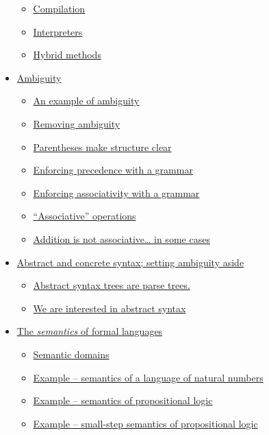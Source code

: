 \documentclass[11pt]{article}
\theoremstyle{definition}
\begin{document}
\begin{scriptsize}
\begin{itemize}
\begin{itemize}
\item \hyperref[sec:orgf94dfeb]{Compilation}
\item \hyperref[sec:orga4e2231]{Interpreters}
\item \hyperref[sec:orgfb8a43b]{Hybrid methods}
\end{itemize}
\item \hyperref[sec:org5846edf]{Ambiguity}
\begin{itemize}
\item \hyperref[sec:orgf5fa90c]{An example of ambiguity}
\item \hyperref[sec:org809ed05]{Removing ambiguity}
\item \hyperref[sec:orgfacd5ca]{Parentheses make structure clear}
\item \hyperref[sec:orgd04cbac]{Enforcing precedence with a grammar}
\item \hyperref[sec:org1bf2b64]{Enforcing associativity with a grammar}
\item \hyperref[sec:org6ad7544]{“Associative” operations}
\item \hyperref[sec:orgf9a2272]{Addition is not associative… in some cases}
\end{itemize}
\item \hyperref[sec:org82e4bfd]{Abstract and concrete syntax; setting ambiguity aside}
\begin{itemize}
\item \hyperref[sec:orgf3f4748]{Abstract syntax trees are parse trees.}
\item \hyperref[sec:orga8a2924]{We are interested in abstract syntax}
\end{itemize}
\item \hyperref[sec:org858dcd4]{The \emph{semantics} of formal languages}
\begin{itemize}
\item \hyperref[sec:org1b5b75d]{Semantic domains}
\item \hyperref[sec:orgf932e15]{Example – semantics of a language of natural numbers}
\item \hyperref[sec:orgd3c8abf]{Example – semantics of propositional logic}
\item \hyperref[sec:org61bdf84]{Example – small-step semantics of propositional logic}
\end{itemize}
\end{itemize}
\end{scriptsize}
\end{document}
